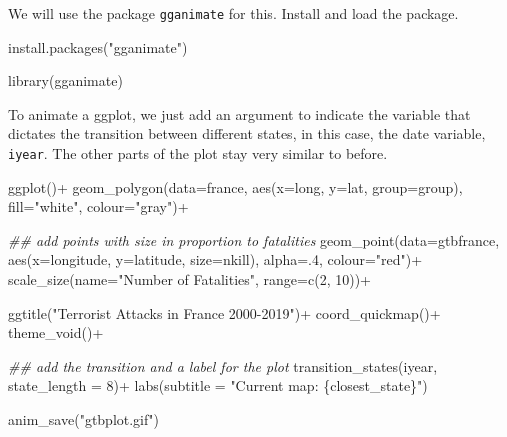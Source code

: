 \documentclass[
  letterpaper,
  DIV=11,
  numbers=noendperiod]{scrreprt}
\newenvironment{Shaded}{\begin{snugshade}}{\end{snugshade}}
\newcommand{\AttributeTok}[1]{\textcolor[rgb]{0.40,0.45,0.13}{#1}}
\newcommand{\DecValTok}[1]{\textcolor[rgb]{0.68,0.00,0.00}{#1}}
\newcommand{\DocumentationTok}[1]{\textcolor[rgb]{0.37,0.37,0.37}{\textit{#1}}}
\newcommand{\FunctionTok}[1]{\textcolor[rgb]{0.28,0.35,0.67}{#1}}
\newcommand{\NormalTok}[1]{\textcolor[rgb]{0.00,0.23,0.31}{#1}}
\newcommand{\SpecialCharTok}[1]{\textcolor[rgb]{0.37,0.37,0.37}{#1}}
\newcommand{\StringTok}[1]{\textcolor[rgb]{0.13,0.47,0.30}{#1}}
\begin{document}
We will use the package \texttt{gganimate} for this. Install and load
the package.

\begin{Shaded}
\begin{Highlighting}[]
\FunctionTok{install.packages}\NormalTok{(}\StringTok{"gganimate"}\NormalTok{)}
\end{Highlighting}
\end{Shaded}

\begin{Shaded}
\begin{Highlighting}[]
\FunctionTok{library}\NormalTok{(gganimate)}
\end{Highlighting}
\end{Shaded}

To animate a ggplot, we just add an argument to indicate the variable
that dictates the transition between different states, in this case, the
date variable, \texttt{iyear}. The other parts of the plot stay very
similar to before.

\begin{Shaded}
\begin{Highlighting}[]
\FunctionTok{ggplot}\NormalTok{()}\SpecialCharTok{+}
  \FunctionTok{geom\_polygon}\NormalTok{(}\AttributeTok{data=}\NormalTok{france, }\FunctionTok{aes}\NormalTok{(}\AttributeTok{x=}\NormalTok{long, }\AttributeTok{y=}\NormalTok{lat, }\AttributeTok{group=}\NormalTok{group), }\AttributeTok{fill=}\StringTok{"white"}\NormalTok{, }\AttributeTok{colour=}\StringTok{"gray"}\NormalTok{)}\SpecialCharTok{+}
  
  \DocumentationTok{\#\# add points with size in proportion to fatalities}
  \FunctionTok{geom\_point}\NormalTok{(}\AttributeTok{data=}\NormalTok{gtbfrance, }\FunctionTok{aes}\NormalTok{(}\AttributeTok{x=}\NormalTok{longitude, }\AttributeTok{y=}\NormalTok{latitude, }\AttributeTok{size=}\NormalTok{nkill), }\AttributeTok{alpha=}\NormalTok{.}\DecValTok{4}\NormalTok{, }\AttributeTok{colour=}\StringTok{"red"}\NormalTok{)}\SpecialCharTok{+}
  \FunctionTok{scale\_size}\NormalTok{(}\AttributeTok{name=}\StringTok{"Number of Fatalities"}\NormalTok{, }\AttributeTok{range=}\FunctionTok{c}\NormalTok{(}\DecValTok{2}\NormalTok{, }\DecValTok{10}\NormalTok{))}\SpecialCharTok{+}

  \FunctionTok{ggtitle}\NormalTok{(}\StringTok{"Terrorist Attacks in France 2000{-}2019"}\NormalTok{)}\SpecialCharTok{+}
  \FunctionTok{coord\_quickmap}\NormalTok{()}\SpecialCharTok{+}
  \FunctionTok{theme\_void}\NormalTok{()}\SpecialCharTok{+}
  
  \DocumentationTok{\#\# add the transition and a label for the plot}
  \FunctionTok{transition\_states}\NormalTok{(iyear, }\AttributeTok{state\_length =} \DecValTok{8}\NormalTok{)}\SpecialCharTok{+}
  \FunctionTok{labs}\NormalTok{(}\AttributeTok{subtitle =} \StringTok{"Current map: \{closest\_state\}"}\NormalTok{)}

\FunctionTok{anim\_save}\NormalTok{(}\StringTok{"gtbplot.gif"}\NormalTok{)}
\end{Highlighting}
\end{Shaded}
\end{document}
